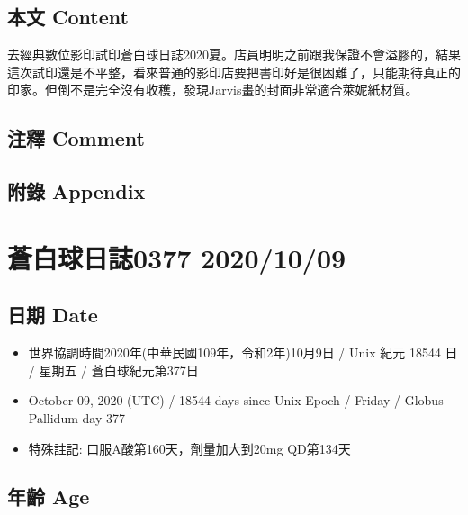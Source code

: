\documentclass[a5paper, 11pt
]{book}
\providecommand{\tightlist}{%
  \setlength{\itemsep}{0pt}\setlength{\parskip}{0pt}}
\begin{document}
\hypertarget{ux672cux6587-content-35}{%
\subsection{本文 Content}\label{ux672cux6587-content-35}}

去經典數位影印試印蒼白球日誌2020夏。店員明明之前跟我保證不會溢膠的，結果這次試印還是不平整，看來普通的影印店要把書印好是很困難了，只能期待真正的印家。但倒不是完全沒有收穫，發現Jarvis畫的封面非常適合萊妮紙材質。

\hypertarget{ux6ce8ux91cb-comment-35}{%
\subsection{注釋 Comment}\label{ux6ce8ux91cb-comment-35}}

\hypertarget{ux9644ux9304-appendix-35}{%
\subsection{附錄 Appendix}\label{ux9644ux9304-appendix-35}}

\hypertarget{ux84bcux767dux7403ux65e5ux8a8c0377-20201009}{%
\section{蒼白球日誌0377
2020/10/09}\label{ux84bcux767dux7403ux65e5ux8a8c0377-20201009}}

\hypertarget{ux65e5ux671f-date-36}{%
\subsection{日期 Date}\label{ux65e5ux671f-date-36}}

\begin{itemize}
\tightlist
\item
  世界協調時間2020年(中華民國109年，令和2年)10月9日 / Unix 紀元 18544 日
  / 星期五 / 蒼白球紀元第377日
\item
  October 09, 2020 (UTC) / 18544 days since Unix Epoch / Friday / Globus
  Pallidum day 377
\item
  特殊註記: 口服A酸第160天，劑量加大到20mg QD第134天
\end{itemize}

\hypertarget{ux5e74ux9f61-age-36}{%
\subsection{年齡 Age}\label{ux5e74ux9f61-age-36}}
\end{document}
